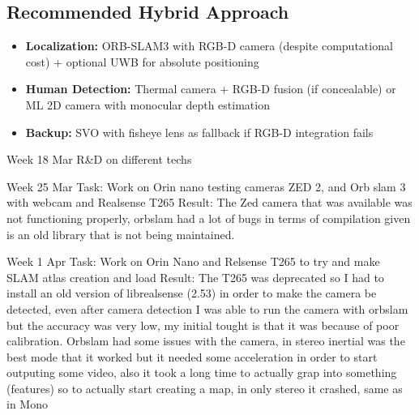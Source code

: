 \subsection*{Recommended Hybrid Approach}
\begin{itemize}
\item \textbf{Localization:} ORB-SLAM3 with RGB-D camera (despite computational cost) + optional UWB for absolute positioning
\item \textbf{Human Detection:} Thermal camera + RGB-D fusion (if concealable) or ML 2D camera with monocular depth estimation
\item \textbf{Backup:} SVO with fisheye lens as fallback if RGB-D integration fails
\end{itemize}




Week 18 Mar
R&D on different techs

Week 25 Mar
Task: Work on Orin nano testing cameras ZED 2, and Orb slam 3 with webcam and Realsense T265
Result: The Zed camera that was available was not functioning properly, orbslam had a lot of bugs in terms of compilation given is an old library that is not being maintained.

Week 1 Apr
Task: Work on Orin Nano and Relsense T265 to try and make SLAM atlas creation and load
Result: The T265 was deprecated so I had to install an old version of librealsense (2.53) in order to make the camera be detected, even after camera detection I was able to run the camera with orbslam but the accuracy was very low, my initial tought is that it was because of poor calibration. Orbslam had some issues with the camera, in stereo inertial was the best mode that it worked but it needed some acceleration in order to start outputing some video, also it took a long time to actually grap into something (features) so to actually start creating a map, in only stereo it crashed, same as in Mono

